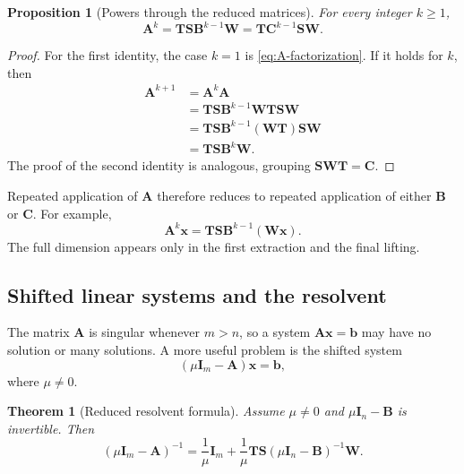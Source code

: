 \documentclass[11pt]{article}
\newcommand{\I}{\mathbf{I}}
\newcommand{\mat}[1]{\mathbf{#1}}
\newcommand{\vect}[1]{\mathbf{#1}}
\newtheorem{theorem}{Theorem}[section]
\newtheorem{proposition}[proposition]{Proposition}
\theoremstyle{definition}
\theoremstyle{remark}
\begin{document}
\begin{proposition}[Powers through the reduced matrices]
\label{prop:powers}
For every integer \(k\geq1\),
\begin{equation}
  \mat{A}^k
  =\mat{T}\mat{S}\mat{B}^{k-1}\mat{W}
  =\mat{T}\mat{C}^{k-1}\mat{S}\mat{W}.
  \label{eq:powers-reduced}
\end{equation}
\end{proposition}

\begin{proof}
For the first identity, the case \(k=1\) is \cref{eq:A-factorization}. If it holds for \(k\), then
\begin{align*}
  \mat{A}^{k+1}
  &=\mat{A}^k\mat{A}\\
  &=\mat{T}\mat{S}\mat{B}^{k-1}\mat{W}
    \mat{T}\mat{S}\mat{W}\\
  &=\mat{T}\mat{S}\mat{B}^{k-1}
    (\mat{W}\mat{T})\mat{S}\mat{W}\\
  &=\mat{T}\mat{S}\mat{B}^{k}\mat{W}.
\end{align*}
The proof of the second identity is analogous, grouping
\(\mat{S}\mat{W}\mat{T}=\mat{C}\).
\end{proof}

Repeated application of \(\mat{A}\) therefore reduces to repeated application of either \(\mat{B}\) or \(\mat{C}\). For example,
\begin{equation}
  \mat{A}^k\vect{x}
  =\mat{T}\mat{S}\mat{B}^{k-1}(\mat{W}\vect{x}).
  \label{eq:power-vector}
\end{equation}
The full dimension appears only in the first extraction and the final lifting.

\subsection{Shifted linear systems and the resolvent}

The matrix \(\mat{A}\) is singular whenever \(m>n\), so a system
\(\mat{A}\vect{x}=\vect{b}\) may have no solution or many solutions. A more useful problem is the shifted system
\begin{equation}
  (\mu\I_m-\mat{A})\vect{x}=\vect{b},
  \label{eq:shifted-system}
\end{equation}
where \(\mu\neq0\).

\begin{theorem}[Reduced resolvent formula]
\label{thm:resolvent}
Assume \(\mu\neq0\) and \(\mu\I_n-\mat{B}\) is invertible. Then
\begin{equation}
  (\mu\I_m-\mat{A})^{-1}
  =
  \frac{1}{\mu}\I_m
  +
  \frac{1}{\mu}
  \mat{T}\mat{S}
  (\mu\I_n-\mat{B})^{-1}
  \mat{W}.
  \label{eq:reduced-resolvent}
\end{equation}
\end{theorem}
\end{document}
